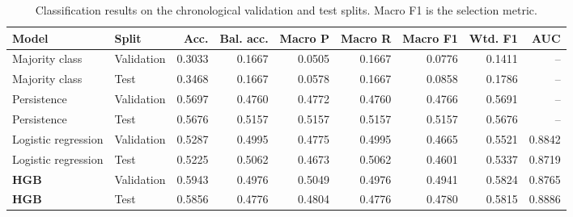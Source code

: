 \begin{table}[htbp]
\centering
\scriptsize
\caption{Classification results on the chronological validation and test splits. Macro F1 is the selection metric.}
\label{tab:clf-metrics}
\begin{tabular}{llrrrrrrr}
\toprule
Model & Split & Acc. & Bal. acc. & Macro P & Macro R & Macro F1 & Wtd. F1 & AUC \\
\midrule
Majority class & Validation & 0.3033 & 0.1667 & 0.0505 & 0.1667 & 0.0776 & 0.1411 & -- \\
Majority class & Test & 0.3468 & 0.1667 & 0.0578 & 0.1667 & 0.0858 & 0.1786 & -- \\
Persistence & Validation & 0.5697 & 0.4760 & 0.4772 & 0.4760 & 0.4766 & 0.5691 & -- \\
Persistence & Test & 0.5676 & 0.5157 & 0.5157 & 0.5157 & 0.5157 & 0.5676 & -- \\
Logistic regression & Validation & 0.5287 & 0.4995 & 0.4775 & 0.4995 & 0.4665 & 0.5521 & 0.8842 \\
Logistic regression & Test & 0.5225 & 0.5062 & 0.4673 & 0.5062 & 0.4601 & 0.5337 & 0.8719 \\
\textbf{HGB} & Validation & 0.5943 & 0.4976 & 0.5049 & 0.4976 & 0.4941 & 0.5824 & 0.8765 \\
\textbf{HGB} & Test & 0.5856 & 0.4776 & 0.4804 & 0.4776 & 0.4780 & 0.5815 & 0.8886 \\
\bottomrule
\end{tabular}

\end{table}
